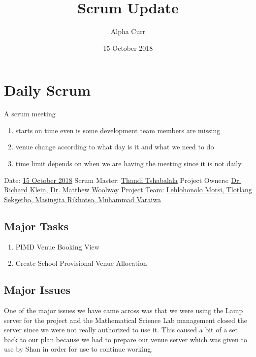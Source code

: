 \documentclass[11pt]{article}
\begin{document}
\title{Scrum Update}
\author{Alpha Curr}
\date{15 October 2018}
\maketitle

\section{Daily Scrum}
A scrum meeting
\begin{enumerate}[nosep, label=\textendash]
	\item starts on time even is some development team members are missing
	\item venue change according to what day is it and what we need to do
	\item time limit depends on when we are having the meeting since it is not daily
\end{enumerate}

\hfill

\noindent
Date: \hspace{18mm} \underline{15 October 2018\hspace{0.3cm}}
\newline
Scrum Master: \hspace{3mm} \underline{Thandi Tshabalala\hspace{0.3cm}}
\newline
Project Owners: \hspace{1mm} \underline{Dr. Richard Klein, Dr. Matthew Woolway\hspace{0.3cm}}
\newline
Project Team: \hspace{5mm} \underline{Lehlohonolo Motsi, Tlotlang Sekgetho, Masingita Rikhotso, Muhammad Varaiwa\hspace{0.3cm}}
\newline

\subsection{Major Tasks}
\begin{enumerate}
\item PIMD Venue Booking View
\item Create School Provisional Venue Allocation
\end{enumerate}

\subsection{Major Issues}
One of the major issues we have came across was that we were using the Lamp server for the project and the Mathematical Science Lab management closed the server since we were not really authorized to use it. This caused a bit of a set back to our plan because we had to prepare our venue server which was given to use by Shan in order for use to continue working.
\end{document}
